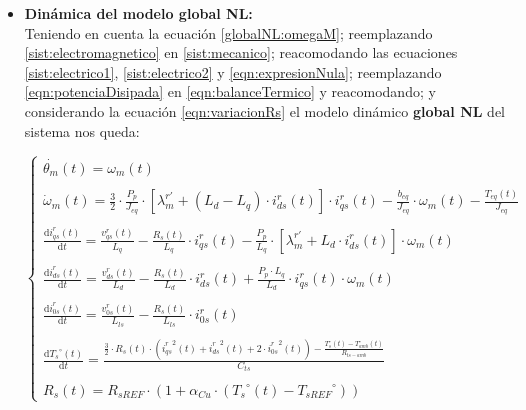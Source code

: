 \documentclass[10pt]{article}
\begin{document}
\begin{enumerate}
\begin{itemize}
		\item \textbf{Dinámica del modelo global NL:}\vspace{0.3cm}\\
		Teniendo en cuenta la ecuación \ref{globalNL:omegaM}; reemplazando \ref{sist:electromagnetico} en \ref{sist:mecanico}; reacomodando las ecuaciones \ref{sist:electrico1}, \ref{sist:electrico2} y \ref{eqn:expresionNula}; reemplazando \ref{eqn:potenciaDisipada} en \ref{eqn:balanceTermico} y reacomodando; y considerando la ecuación \ref{eqn:variacionRs} el modelo dinámico \textbf{global NL} del sistema nos queda:
		
		
		\begin{equation}
			\label{eqn:sistGlobalNL}
			\begin{cases}
				\dot{\theta_{m}}(t)=\omega_{m}(t)
				\\
				\\
				\dot{\omega }_{m}\left ( t \right )=\frac{3}{2}\cdot\frac{P_{p}}{J_{eq}}\cdot [ \lambda_{m}^{r'}+\left ( L_{d}-L_{q} \right )\cdot i_{ds}^{r} (t)]\cdot i_{qs}^{r}(t)-\frac{b_{eq}}{J_{eq}}\cdot\omega_{m}(t)-\frac{T_{eq}(t)}{J_{eq}}
				\\
				\\
				\frac{\mathrm{d} i_{qs}^{r}\left ( t \right )}{\mathrm{d} t}=\frac{v_{qs}^{r}(t)}{L_{q}}-\frac{R_{s}\left ( t \right )}{L_{q}}\cdot i_{qs}^{r}(t)-\frac{P_{p}}{L_{q}}\cdot [ \lambda_{m}^{r'}+L_{d}\cdot i_{ds}^{r}(t) ]\cdot \omega_{m}(t)
				\\
				\\
				\frac{\mathrm{d} i_{ds}^{r}\left ( t \right )}{\mathrm{d} t}=\frac{v_{ds}^{r}(t)}{L_{d}}-\frac{R_{s}\left ( t \right )}{L_{d}}\cdot i_{ds}^{r}(t)+\frac{P_{p}\cdot L_{q}}{L_{d}}\cdot i_{qs}^{r}(t)\cdot \omega_{m}(t)
				\\
				\\
				\frac{\mathrm{d} i_{0s}^{r}\left ( t \right )}{\mathrm{d} t}=\frac{v_{0s}^{r}(t)}{L_{ls}}-\frac{R_{s}\left ( t \right )}{L_{ls}}\cdot i_{0s}^{r}\left ( t \right )
				\\
				\\
				\frac{\mathrm{d} {T_{s}}^{\circ}\left ( t \right )}{\mathrm{d} t}=\frac{\frac{3}{2}\cdot R_{s}\left ( t \right )\cdot \left ( {i_{qs}^{r}}^{2}\left ( t \right )+{i_{ds}^{r}}^{2}\left ( t \right )+2\cdot {i_{0s}^{r}}^{2}\left ( t \right ) \right )-\frac{T_{s}^{\circ}\left ( t \right )-T_{amb}^{\circ}\left ( t \right )}{R_{ts-amb}}}{C_{ts}}
				\\
				\\
				R_{s}\left ( t \right )=R_{sREF}\cdot \left ( 1+\alpha_{Cu}\cdot \left ( {T_{s}}^{\circ}\left ( t \right )-{T_{sREF}}^{\circ} \right ) \right )

\end{cases}
\end{equation}
\end{itemize}
\end{enumerate}
\end{document}

